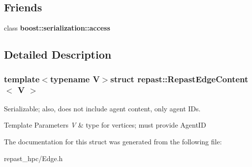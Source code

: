 \subsection*{Friends}
\begin{DoxyCompactItemize}
\item 
\hypertarget{structrepast_1_1_repast_edge_content_ac98d07dd8f7b70e16ccb9a01abf56b9c}{class {\bfseries boost\-::serialization\-::access}}\label{structrepast_1_1_repast_edge_content_ac98d07dd8f7b70e16ccb9a01abf56b9c}

\end{DoxyCompactItemize}


\subsection{Detailed Description}
\subsubsection*{template$<$typename V$>$struct repast\-::\-Repast\-Edge\-Content$<$ V $>$}

Serializable; also, does not include agent content, only agent I\-Ds. 


\begin{DoxyTemplParams}{Template Parameters}
{\em V} & type for vertices; must provide Agent\-I\-D \\
\hline
\end{DoxyTemplParams}


The documentation for this struct was generated from the following file\-:\begin{DoxyCompactItemize}
\item 
repast\-\_\-hpc/Edge.\-h\end{DoxyCompactItemize}
